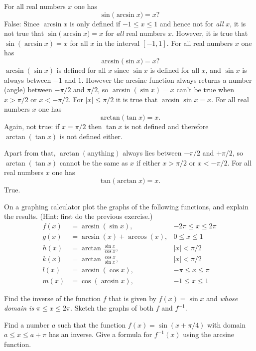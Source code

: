 \begin{multicols}{2}
\subprob For all real numbers $x$ one has
\[
\sin\bigl(\arcsin x\bigr) = x?
\]
\answer
False: Since $\arcsin x$ is only defined if $-1\leq x\leq 1$ and hence
not for \emph{all} $x$, it is not true that $\sin\bigl(\arcsin
x\bigr) = x$ for \emph{all} real numbers $x$.
However, it is true that $\sin(\arcsin x) = x$ for all $x$ in
the interval $[-1,1]$.
\endanswer
\subprob For all real numbers $x$ one has
\[
\arcsin\bigl(\sin x\bigr) = x?
\]
\answer
$\arcsin(\sin x)$ is defined for all $x$ since $\sin x$ is
defined for all $x$, and $\sin x$ is always between $-1$ and $1$.
However the arcsine function always returns a number (angle) between
$-\pi/2$ and $\pi/2$, so $\arcsin( \sin x) = x$ can't be true when
$x>\pi/2$ or $x<-\pi/2$.  For $|x|\leq \pi/2$ it is true that $\arcsin
\sin x = x$.
\endanswer
\subprob For all real numbers $x$ one has
\[
\arctan\bigl( \tan x\bigr) = x.
\]
\answer
Again, not true: if $x=\pi/2$ then $\tan x$ is not defined and therefore
$\arctan(\tan x)$ is not defined either.

Apart from that, $\arctan (\text{anything})$ always lies
between $-\pi/2 $ and $+\pi/2$, so $\arctan(\tan x)$ cannot
be the same as $x$ if either $x>\pi/2$ or $x<-\pi/2$.
\endanswer
\subprob For all real numbers $x$ one has
\[
\tan\bigl( \arctan x\bigr) = x.
\]
\answer
True.
\endanswer






\problem On a graphing calculator plot the graphs of the following
functions, and explain the results. (Hint: first do the previous exercise.)
\begin{align*}
  f(x) &= \arcsin(\sin x),  &  -2\pi\leq x\leq 2\pi \\
  g(x) &= \arcsin(x) + \arccos(x),  &  0\leq x\leq 1 \\
  h(x) &= \arctan\frac{\sin x}{\cos x},  &  |x|< \pi/2 \\
  k(x) &= \arctan\frac{\cos x}{\sin x},  &  |x|< \pi/2 \\
  l(x) &= \arcsin(\cos x),  &  -\pi\leq x\leq \pi \\
  m(x) &= \cos(\arcsin x),  &  -1\leq x\leq 1
\end{align*}


\problem Find the inverse of the function $f$ that is given by $f(x) =
\sin x$ and \emph{whose domain is }$\pi\leq x\leq 2\pi$.  Sketch the graphs
of both $f$ and $f^{-1}$.


\problem Find a number $a$ such that the function $f(x) = \sin(x+\pi/4)$
with domain $a\leq x\leq a+\pi$ has an inverse.  Give a formula for
$f^{-1}(x)$ using the arcsine function.


\end{multicols}
